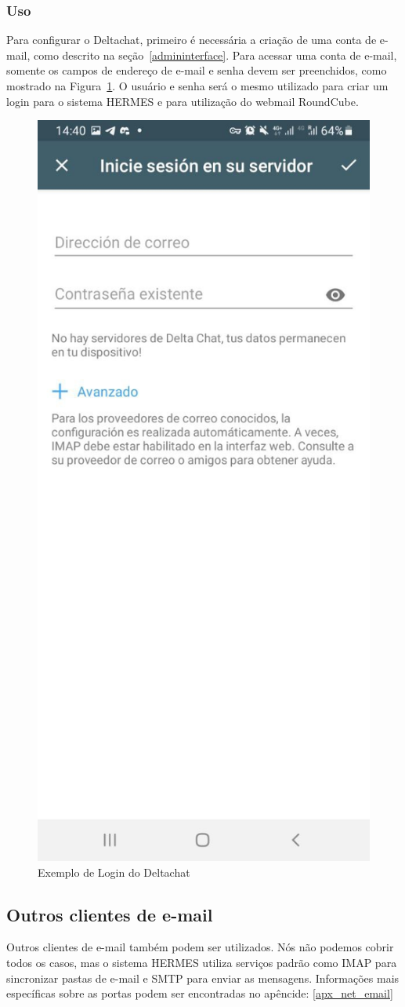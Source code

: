 \documentclass[11pt,a4paper]{article}
\begin{document}
\subsubsection{Uso}
Para configurar o Deltachat, primeiro é necessária a criação de uma conta de e-mail, como descrito na seção~\ref{admininterface}. Para acessar uma conta de e-mail, somente os campos de endereço de e-mail e senha devem ser preenchidos, como mostrado na Figura~\ref{fig:deltachat-login}. O usuário e senha será o mesmo utilizado para criar um login para o sistema HERMES e para utilização do webmail RoundCube. 



\begin{figure}[H]
    \centering
    \includegraphics[width=0.3\columnwidth]{screenshots/deltachat/es/login_es.jpeg}
    	\caption{Exemplo de Login do Deltachat}
	\vspace{-10pt}
    \label{fig:deltachat-login}
\end{figure}

\subsection{Outros clientes de e-mail}

Outros clientes de e-mail também podem ser utilizados. Nós não podemos cobrir todos os casos, mas o sistema HERMES utiliza serviços padrão como IMAP para sincronizar pastas de e-mail e SMTP para enviar as mensagens. Informações mais específicas sobre as portas podem ser encontradas no apêncide: \ref{apx_net_email}
\end{document}
